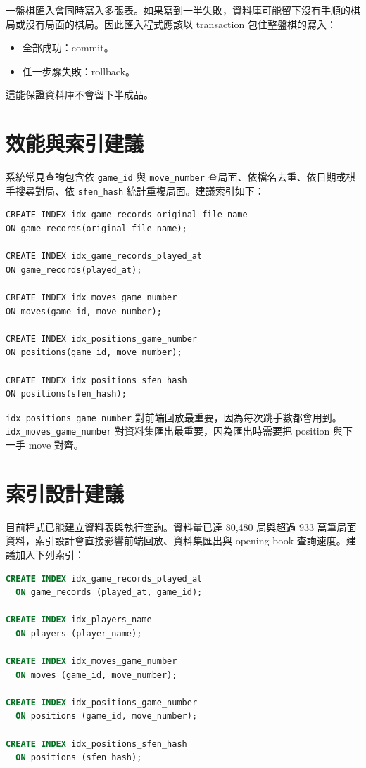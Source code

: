 \documentclass[12pt,a4paper,fontset=none]{ctexart}
\begin{document}
一盤棋匯入會同時寫入多張表。如果寫到一半失敗，資料庫可能留下沒有手順的棋局或沒有局面的棋局。因此匯入程式應該以 transaction 包住整盤棋的寫入：

\begin{itemize}
  \item 全部成功：commit。
  \item 任一步驟失敗：rollback。
\end{itemize}

這能保證資料庫不會留下半成品。


\section{效能與索引建議}

系統常見查詢包含依 \texttt{game\_id} 與 \texttt{move\_number} 查局面、依檔名去重、依日期或棋手搜尋對局、依 \texttt{sfen\_hash} 統計重複局面。建議索引如下：

\begin{lstlisting}[style=cmd]
CREATE INDEX idx_game_records_original_file_name
ON game_records(original_file_name);

CREATE INDEX idx_game_records_played_at
ON game_records(played_at);

CREATE INDEX idx_moves_game_number
ON moves(game_id, move_number);

CREATE INDEX idx_positions_game_number
ON positions(game_id, move_number);

CREATE INDEX idx_positions_sfen_hash
ON positions(sfen_hash);
\end{lstlisting}

\texttt{idx\_positions\_game\_number} 對前端回放最重要，因為每次跳手數都會用到。 \texttt{idx\_moves\_game\_number} 對資料集匯出最重要，因為匯出時需要把 position 與下一手 move 對齊。

\section{索引設計建議}

目前程式已能建立資料表與執行查詢。資料量已達 80,480 局與超過 933 萬筆局面資料，索引設計會直接影響前端回放、資料集匯出與 opening book 查詢速度。建議加入下列索引：

\begin{lstlisting}[style=sqlstyle,language=SQL]
CREATE INDEX idx_game_records_played_at
  ON game_records (played_at, game_id);

CREATE INDEX idx_players_name
  ON players (player_name);

CREATE INDEX idx_moves_game_number
  ON moves (game_id, move_number);

CREATE INDEX idx_positions_game_number
  ON positions (game_id, move_number);

CREATE INDEX idx_positions_sfen_hash
  ON positions (sfen_hash);
\end{lstlisting}
\end{document}
